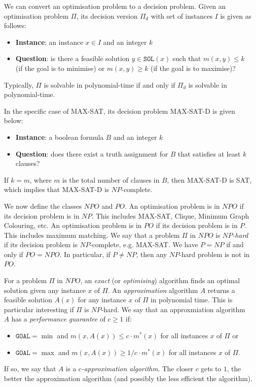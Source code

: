 \documentclass[a4paper, openany]{memoir}
\begin{document}
    We can convert an optimisation problem to a decision problem. Given an optimisation problem $\Pi$, its decision version $\Pi_d$ with set of instances $I$ is given as follows: 
    \begin{itemize}
        \item \textbf{Instance}: an instance $x \in I$ and an integer $k$
        \item \textbf{Question}: is there a feasible solution $y \in \texttt{SOL}(x)$ such that $m(x, y) \leq k$ (if the goal is to minimise) or $m(x, y) \geq k$ (if the goal is to maximise)?
    \end{itemize}
    Typically, $\Pi$ is solvable in polynomial-time if and only if $\Pi_d$ is solvable in polynomial-time.

    In the specific case of MAX-SAT, its decision problem MAX-SAT-D is given below:
    \begin{itemize}
        \item \textbf{Instance}: a boolean formula $B$ and an integer $k$
        \item \textbf{Question}: does there exist a truth assignment for $B$ that satisfies at least $k$ clauses?
    \end{itemize}
    If $k = m$, where $m$ is the total number of clauses in $B$, then MAX-SAT-D is SAT, which implies that MAX-SAT-D is $NP$-complete.

    We now define the classes $NPO$ and $PO$. An optimisation problem is in $NPO$ if its decision problem is in $NP$. This includes MAX-SAT, Clique, Minimum Graph Colouring, etc. An optimisation problem is in $PO$ if its decision problem is in $P$. This includes maximum matching. We say that a problem $\Pi$ in $NPO$ is \emph{$NP$-hard} if its decision problem is $NP$-complete, e.g. MAX-SAT. We have $P = NP$ if and only if $PO = NPO$. In particular, if $P \neq NP$, then any $NP$-hard problem is not in $PO$.

    For a problem $\Pi$ in $NPO$, an \emph{exact} (or \emph{optimising}) algorithm finds an optimal solution given any instance $x$ of $\Pi$. An \emph{approximation} algorithm $A$ returns a feasible solution $A(x)$ for any instance $x$ of $\Pi$ in polynomial time. This is particular interesting if $\Pi$ is $NP$-hard. We say that an approxmiation algorithm $A$ has a \emph{performance guarantee} of $c \geq 1$ if:
    \begin{itemize}
        \item $\texttt{GOAL} = \min$ and $m(x, A(x)) \leq c \cdot m^*(x)$ for all instances $x$ of $\Pi$ or
        \item $\texttt{GOAL} = \max$ and $m(x, A(x)) \geq 1/c \cdot m^*(x)$ for all instances $x$ of $\Pi$.
    \end{itemize}
    If so, we say that $A$ is a \emph{$c$-approximation algorithm}. The closer $c$ gets to $1$, the better the approximation algorithm (and possibly the less efficient the algorithm).
\end{document}
